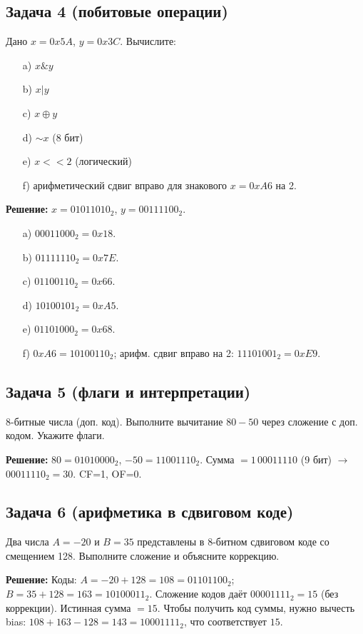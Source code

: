 \documentclass[a4paper,14pt]{report}
\begin{document}
\subsection*{Задача 4 (побитовые операции)}
Дано $x = 0x5A$, $y = 0x3C$. Вычислите:
\begin{enumerate}
    \item[a)] $x \& y$
    \item[b)] $x | y$
    \item[c)] $x \oplus y$
    \item[d)] $\sim x$ (8 бит)
    \item[e)] $x << 2$ (логический)
    \item[f)] арифметический сдвиг вправо для знакового $x = 0xA6$ на 2.
\end{enumerate}

\textbf{Решение:}
$x=01011010_2$, $y=00111100_2$.
\begin{enumerate}
    \item[a)] $00011000_2 = 0x18$.
    \item[b)] $01111110_2 = 0x7E$.
    \item[c)] $01100110_2 = 0x66$.
    \item[d)] $10100101_2 = 0xA5$.
    \item[e)] $01101000_2 = 0x68$.
    \item[f)] $0xA6=10100110_2$; арифм. сдвиг вправо на 2: $11101001_2 = 0xE9$.
\end{enumerate}

\subsection*{Задача 5 (флаги и интерпретации)}
8-битные числа (доп. код). Выполните вычитание $80 - 50$ через сложение с доп. кодом. Укажите флаги.

\textbf{Решение:}
$80=01010000_2$, $-50=11001110_2$. Сумма $=1\,00011110$ (9 бит) $\to$ $00011110_2=30$. CF=1, OF=0.

\subsection*{Задача 6 (арифметика в сдвиговом коде)}
Два числа $A=-20$ и $B=35$ представлены в 8-битном сдвиговом коде со смещением 128. Выполните сложение и объясните коррекцию.

\textbf{Решение:}
Коды: $A= -20+128=108=01101100_2$; $B=35+128=163=10100011_2$. Сложение кодов даёт $00001111_2=15$ (без коррекции). Истинная сумма $=15$. Чтобы получить код суммы, нужно вычесть bias: $108+163-128=143=10001111_2$, что соответствует $15$.
\end{document}
